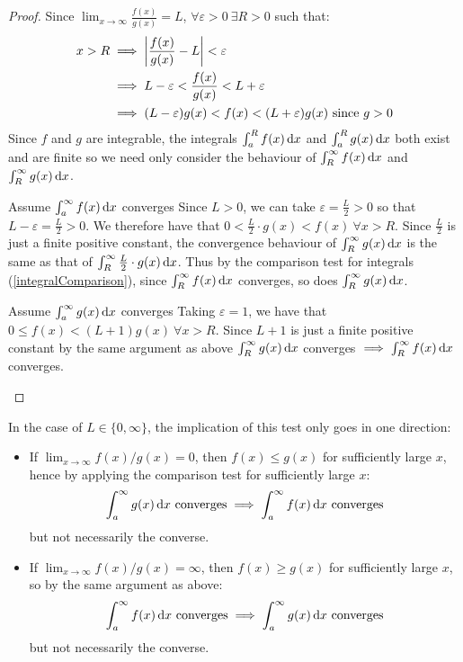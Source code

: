 \documentclass[../main.tex]{subfiles}
\begin{document}
\begin{proof}
  Since $\lim_{x \to \infty} \frac{f(x)}{g(x)} = L$, $\forall \varepsilon > 0\ \exists R > 0$ such that:
  \begin{align*}
    x > R &\implies \left\lvert \frac{f(x)}{g(x)} - L \right\rvert < \varepsilon \\
          &\implies L - \varepsilon < \frac{f(x)}{g(x)} < L + \varepsilon \\
          &\implies (L - \varepsilon) g(x) < f(x) < (L + \varepsilon) g(x) \text{ since $g > 0$}
  \end{align*}
  Since $f$ and $g$ are integrable, the integrals $\int_{a}^{R} f(x) \d{x}$ and $\int_{a}^{R} g(x) \d{x}$ both exist and are finite so we need only consider the behaviour of $\int_{R}^{\infty} f(x) \d{x}$ and $\int_{R}^{\infty} g(x) \d{x}$.
  \begin{proofdirection}{Assume $\int_{a}^{\infty} f(x) \d{x}$ converges}
    Since $L > 0$, we can take $\varepsilon = \frac{L}{2} > 0$ so that $L - \varepsilon = \frac{L}{2} > 0$.
    We therefore have that $0 < \frac{L}{2} \cdot g(x) < f(x)\ \forall x > R$.
    Since $\frac{L}{2}$ is just a finite positive constant, the convergence behaviour of $\int_{R}^{\infty} g(x) \d{x}$ is the same as that of $\int_{R}^{\infty} \frac{L}{2} \cdot g(x) \d{x}$.
    Thus by the comparison test for integrals (\cref{integralComparison}), since $\int_{R}^{\infty} f(x) \d{x}$ converges, so does $\int_{R}^{\infty} g(x) \d{x}$.
  \end{proofdirection}
  \begin{proofdirection}{Assume $\int_{a}^{\infty} g(x) \d{x}$ converges}
    Taking $\varepsilon = 1$, we have that $0 \leq f(x) < (L + 1) g(x)\ \forall x > R$.
    Since $L + 1$ is just a finite positive constant by the same argument as above $\int_{R}^{\infty} g(x) \d{x}$ converges $\implies \int_{R}^{\infty} f(x) \d{x}$ converges.
  \end{proofdirection}
\end{proof}
\begin{remark}
  In the case of $L \in \{0, \infty\}$, the implication of this test only goes in one direction:
  \begin{itemize}
    \item If $\lim_{x \to \infty} f(x)/g(x) = 0$, then $f(x) \leq g(x)$ for sufficiently large $x$, hence by applying the comparison test for sufficiently large $x$:
      \[
        \int_{a}^{\infty} g(x) \d{x} \text{ converges} \implies \int_{a}^{\infty} f(x) \d{x} \text{ converges}
      \]
      but not necessarily the converse.
    \item If $\lim_{x \to \infty} f(x)/g(x) = \infty$, then $f(x) \geq g(x)$ for sufficiently large $x$, so by the same argument as above:
      \[
        \int_{a}^{\infty} f(x) \d{x} \text{ converges} \implies \int_{a}^{\infty} g(x) \d{x} \text{ converges}
      \]
      but not necessarily the converse.
  \end{itemize}
\end{remark}
\end{document}
